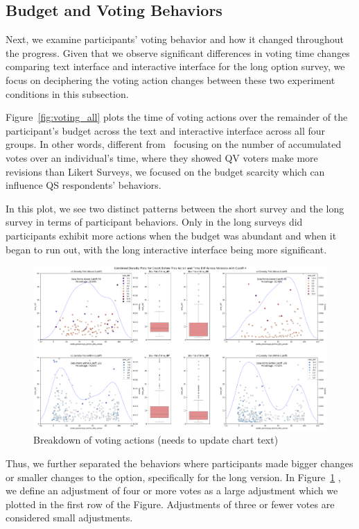 \subsection{Budget and Voting Behaviors}
Next, we examine participants' voting behavior and how it changed throughout the progress. Given that we observe significant differences in voting time changes comparing text interface and interactive interface for the long option survey, we focus on deciphering the voting action changes between these two experiment conditions in this subsection.

Figure~\ref{fig:voting_all} plots the time of voting actions over the remainder of the participant's budget across the text and interactive interface across all four groups. In other words, different from~\textcite{quarfoot2017quadratic} focusing on the number of accumulated votes over an individual's time, where they showed QV voters make more revisions than Likert Surveys, we focused on the budget scarcity which can influence QS respondents' behaviors.

In this plot, we see two distinct patterns between the short survey and the long survey in terms of participant behaviors. Only in the long surveys did participants exhibit more actions when the budget was abundant and when it began to run out, with the long interactive interface being more significant.

\begin{figure}[h]
    \centering
    \includegraphics[width=\textwidth]{content/image/results/temp_cut4.png}
    \caption{Breakdown of voting actions (needs to update chart text)}
    \label{fig:voting_v3_v4}
\end{figure}

Thus, we further separated the behaviors where participants made bigger changes or smaller changes to the option, specifically for the long version. In Figure~\ref{fig:voting_v3_v4} , we define an adjustment of four or more votes as a large adjustment which we plotted in the first row of the Figure. Adjustments of three or fewer votes are considered small adjustments.

